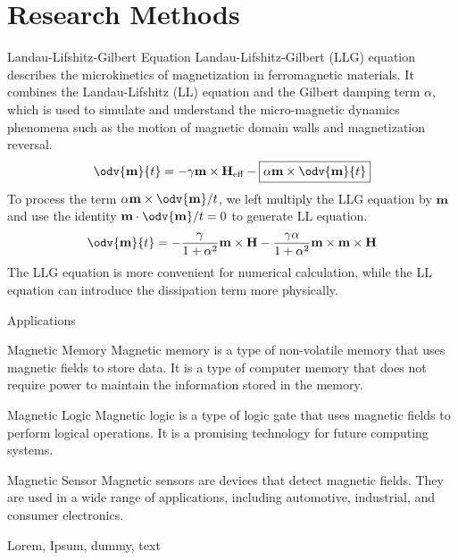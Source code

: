 \documentclass[ mode = beamer, handout ]{hduthesis}
\begin{document}
\maketitle

\section{Research Methods}

\begin{frame}{Landau-Lifshitz-Gilbert Equation}
  \pause
  Landau-Lifshitz-Gilbert (LLG) equation describes the microkinetics of magnetization in ferromagnetic materials. It combines the Landau-Lifshitz (LL) equation and the Gilbert damping term $\alpha$, which is used to simulate and understand the micro-magnetic dynamics phenomena such as the motion of magnetic domain walls and magnetization reversal.
  \pause
  \begin{equation}
    \odv{\mathbf m}{t} = -\gamma \mathbf m \times \mathbf H_\text{eff} -
    \boxed{\alpha \mathbf m \times \odv{\mathbf m}{t}}
  \end{equation}
  \pause
  To process the term $\alpha \mathbf m \times \odv{\mathbf m}/{t}$,
  we left multiply the LLG equation by $\mathbf m$ and use the identity
  $\mathbf m \cdot \odv{\mathbf m}/{t} = 0$ to generate LL equation.
  \pause
  \begin{equation}
    \odv{\mathbf m}{t} = -\frac{\gamma}{1 + \alpha^2} \mathbf m \times \mathbf H - \frac{\gamma\alpha}{1 + \alpha^2} \mathbf m \times \mathbf m \times \mathbf H
  \end{equation}
  \pause
  \alert{The LLG equation is more convenient for numerical calculation, while the LL equation can introduce the dissipation term more physically.}
\end{frame}

\begin{frame}{Applications}
  \pause
  \begin{block}{Magnetic Memory}
    Magnetic memory is a type of non-volatile memory that uses magnetic fields to store data. It is a type of computer memory that does not require power to maintain the information stored in the memory.
  \end{block}
  \pause
  \begin{exampleblock}{Magnetic Logic}
    Magnetic logic is a type of logic gate that uses magnetic fields to perform logical operations. It is a promising technology for future computing systems.
  \end{exampleblock}
  \pause
  \begin{alertblock}{Magnetic Sensor}
    Magnetic sensors are devices that detect magnetic fields. They are used in a wide range of applications, including automotive, industrial, and consumer electronics.
  \end{alertblock}
  Lorem\cite{xu2023unified},
  Ipsum\cite{wang2023electrical},
  dummy\cite{haug2008quantum},
  text\cite{wang2024switching,jhuria2020spin, gilbert2004phenomenological, foros2005magnetization,
        chudnovskiy2008spin, foros2009noise, swiebodzinski2010spin,
        brataas2008scattering, brataas2011magnetization}
\end{frame}
\end{document}
